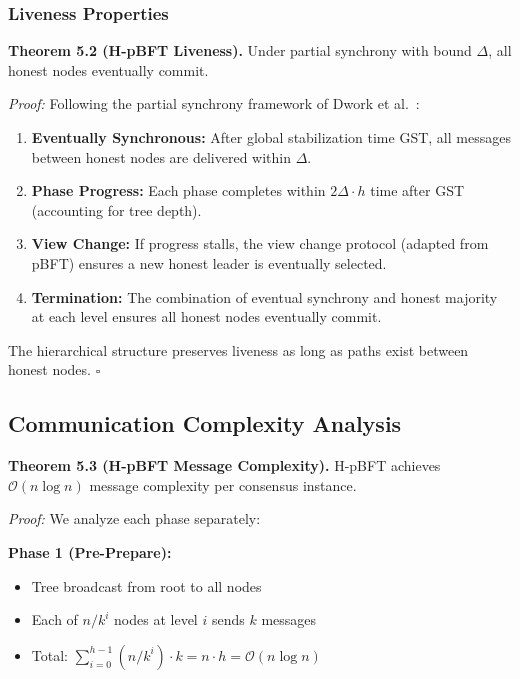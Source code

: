\documentclass[conference]{IEEEtran}
\newcommand{\bigO}{\mathcal{O}}
\begin{document}
\subsubsection{Liveness Properties}

\textbf{Theorem 5.2 (H-pBFT Liveness).} Under partial synchrony with bound $\Delta$, all honest nodes eventually commit.

\textit{Proof:} Following the partial synchrony framework of Dwork et al.~\cite{dwork1988consensus}:

\begin{enumerate}
    \item \textbf{Eventually Synchronous:} After global stabilization time GST, all messages between honest nodes are delivered within $\Delta$.
    
    \item \textbf{Phase Progress:} Each phase completes within $2\Delta \cdot h$ time after GST (accounting for tree depth).
    
    \item \textbf{View Change:} If progress stalls, the view change protocol (adapted from pBFT) ensures a new honest leader is eventually selected.
    
    \item \textbf{Termination:} The combination of eventual synchrony and honest majority at each level ensures all honest nodes eventually commit.
\end{enumerate}

The hierarchical structure preserves liveness as long as paths exist between honest nodes. $\square$

\subsection{Communication Complexity Analysis}

\textbf{Theorem 5.3 (H-pBFT Message Complexity).} H-pBFT achieves $\bigO(n \log n)$ message complexity per consensus instance.

\textit{Proof:} We analyze each phase separately:

\textbf{Phase 1 (Pre-Prepare):}
\begin{itemize}
    \item Tree broadcast from root to all nodes
    \item Each of $n/k^i$ nodes at level $i$ sends $k$ messages
    \item Total: $\sum_{i=0}^{h-1} (n/k^i) \cdot k = n \cdot h = \bigO(n \log n)$
\end{itemize}
\end{document}
